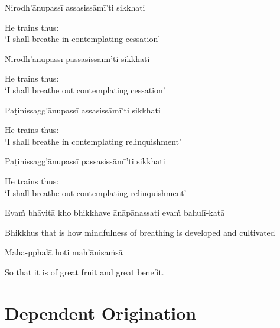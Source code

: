 Nirodh'ānupassī assasissāmī'ti sikkhati

\begin{english}
  He trains thus:\\
  `I shall breathe in contemplating cessation'
\end{english}

Nirodh'ānupassī passasissāmī'ti sikkhati

\begin{english}
  He trains thus:\\
  `I shall breathe out contemplating cessation'
\end{english}

Paṭinissagg'ānupassī assasissāmī'ti sikkhati

\begin{english}
  He trains thus:\\
  `I shall breathe in contemplating relinquishment'
\end{english}

Paṭinissagg'ānupassī passasissāmī'ti sikkhati

\begin{english}
  He trains thus:\\
  `I shall breathe out contemplating relinquishment'
\end{english}

Evaṁ bhāvitā kho bhikkhave ānāpānassati evaṁ bahulī-katā

\begin{english-hang}
  Bhikkhus that is how mindfulness of breathing is developed and cultivated
\end{english-hang}

Maha-pphalā hoti mah'ānisaṁsā

\begin{english}
  So that it is of great fruit and great benefit.
\end{english}

\suttaRef{[MN 118]}


\section{Dependent Origination}
\label{dependent-origination}

